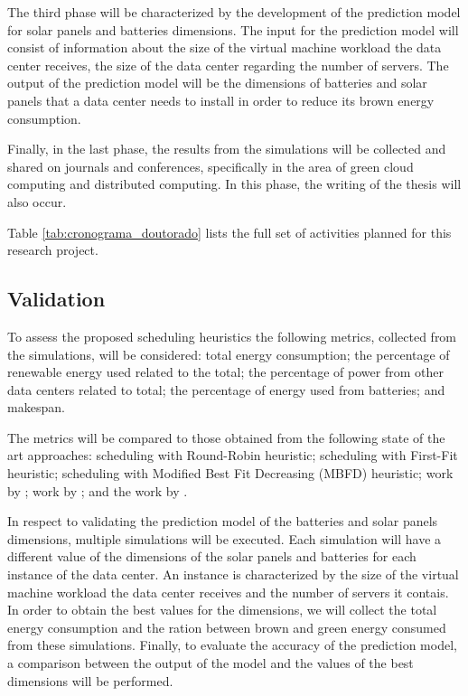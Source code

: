 \documentclass[12pt,a4paper]{article}
\begin{document}
The third phase will be characterized by the development of the prediction model for solar panels and batteries dimensions. The input for the prediction model will consist of information about the size of the virtual machine workload the data center receives, the size of the data center regarding the number of servers. The output of the prediction model will be the dimensions of batteries and solar panels that a data center needs to install in order to reduce its brown energy consumption.

Finally, in the last phase, the results from the simulations will be collected and shared on journals and conferences, specifically in the area of green cloud computing and distributed computing. In this phase, the writing of the thesis will also occur.

Table \ref{tab:cronograma_doutorado} lists the full set of activities planned for this research project.

\subsection{Validation}

To assess the proposed scheduling heuristics the following metrics, collected from the simulations, will be considered:
total energy consumption; the percentage of renewable energy used related to the total; the percentage of power from other data centers related to total; the percentage of energy used from batteries; and makespan.

The metrics will be compared to those obtained from the following state of the art approaches: scheduling with Round-Robin heuristic; scheduling with First-Fit heuristic; scheduling with Modified Best Fit Decreasing (MBFD) heuristic; work by \citet{Courchelle}; work by \citet{datazero}; and the work by \citet{sgeess}.


In respect to validating the prediction model of the batteries and solar panels dimensions, multiple simulations will be executed. Each simulation will have a different value of the dimensions of the solar panels and batteries for each instance of the data center. An instance is characterized by the size of the virtual machine workload the data center receives and the number of servers it contais. In order to obtain the best values for the dimensions, we will collect the total energy consumption and the ration between brown and green energy consumed from these simulations. Finally, to evaluate the accuracy of the prediction model, a comparison between the output of the model and the values of the best dimensions will be performed.
\end{document}

